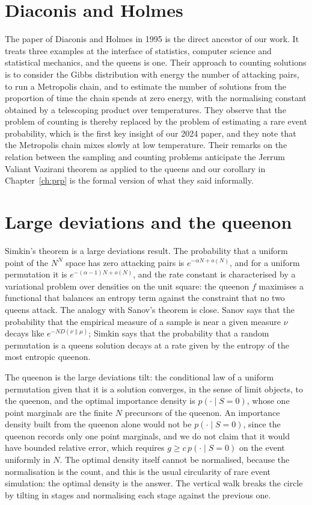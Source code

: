 \section{Diaconis and Holmes}

The paper of Diaconis and Holmes in 1995 is the direct ancestor of our work. It treats three examples at the interface of statistics, computer science and statistical mechanics, and the queens is one. Their approach to counting solutions is to consider the Gibbs distribution with energy the number of attacking pairs, to run a Metropolis chain, and to estimate the number of solutions from the proportion of time the chain spends at zero energy, with the normalising constant obtained by a telescoping product over temperatures. They observe that the problem of counting is thereby replaced by the problem of estimating a rare event probability, which is the first key insight of our 2024 paper, and they note that the Metropolis chain mixes slowly at low temperature. Their remarks on the relation between the sampling and counting problems anticipate the Jerrum Valiant Vazirani theorem as applied to the queens and our corollary in Chapter~\ref{ch:prp} is the formal version of what they said informally.

\section{Large deviations and the queenon}

Simkin's theorem is a large deviations result. The probability that a uniform point of the $N^N$ space has zero attacking pairs is $e^{-\alpha N + o(N)}$, and for a uniform permutation it is $e^{-(\alpha - 1) N + o(N)}$, and the rate constant is characterised by a variational problem over densities on the unit square: the queenon $f$ maximises a functional that balances an entropy term against the constraint that no two queens attack. The analogy with Sanov's theorem is close. Sanov says that the probability that the empirical measure of a sample is near a given measure $\nu$ decays like $e^{-N D(\nu \| \mu)}$; Simkin says that the probability that a random permutation is a queens solution decays at a rate given by the entropy of the most entropic queenon.

The queenon is the large deviations tilt: the conditional law of a uniform permutation given that it is a solution converges, in the sense of limit objects, to the queenon, and the optimal importance density is $p(\cdot \mid S = 0)$, whose one point marginals are the finite $N$ precursors of the queenon. An importance density built from the queenon alone would not be $p(\cdot \mid S = 0)$, since the queenon records only one point marginals, and we do not claim that it would have bounded relative error, which requires $g \ge c \, p(\cdot \mid S = 0)$ on the event uniformly in $N$. The optimal density itself cannot be normalised, because the normalisation is the count, and this is the usual circularity of rare event simulation: the optimal density is the answer. The vertical walk breaks the circle by tilting in stages and normalising each stage against the previous one.

